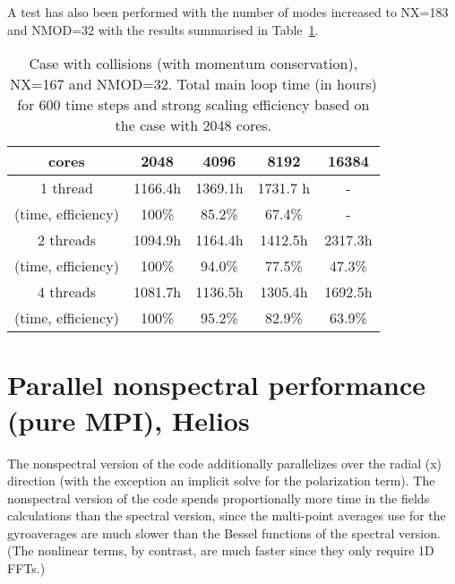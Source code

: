 A test has also been performed with the number of modes increased to NX=183 and NMOD=32 with the results summarised in Table~\ref{table:bigcol}.
\begin{small}
\begin{table}
\begin{center}
\begin{tabular}{|c|c|c|c|c|}
\hline
cores & 2048 & 4096 & 8192 & 16384\\
\hline
1 thread& 1166.4h & 1369.1h & 1731.7 h & - \\
(time, efficiency) & 100\% & 85.2\%  & 67.4\%  & -\\
\hline
2 threads & 1094.9h& 1164.4h & 1412.5h & 2317.3h \\
(time, efficiency) & 100\% & 94.0\%& 77.5\% & 47.3\%\\
\hline
4 threads &1081.7h & 1136.5h & 1305.4h & 1692.5h \\
(time, efficiency) & 100\% & 95.2\% & 82.9\% & 63.9\%\\
\hline
\end{tabular}
\caption{Case with collisions (with momentum conservation), NX=167 and NMOD=32. Total main loop time (in hours) for 600 time steps and strong scaling efficiency based on the case with 2048 cores. }
\label{table:bigcol}
\end{center}
\end{table}
\end{small}

\pagebreak


\section{Parallel nonspectral performance (pure MPI), Helios}

The nonspectral version of the code additionally parallelizes over the radial (x) direction (with the exception an implicit solve for the polarization term).  The nonspectral 
version of the code spends proportionally more time in the fields calculations than the spectral version, since the multi-point averages use for the gyroaverages are much slower 
than the Bessel functions of the spectral version. (The nonlinear terms, by contrast, are much faster since they only require 1D FFTs.)

